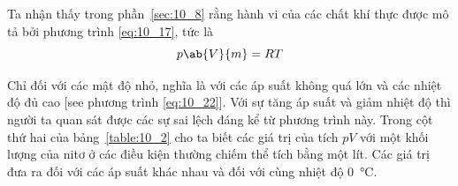 
Ta nhận thấy trong phần~\ref{sec:10_8} rằng hành vi của các chất khí thực được mô tả bởi phương trình \eqref{eq:10_17}, tức là
\begin{equation*}
	p\ab{V}{m} = RT
\end{equation*}

\noindent

Chỉ đối với các mật độ nhỏ, nghĩa là với các áp suất không quá lớn và các nhiệt độ đủ cao [see phương trình \eqref{eq:10_22}]. Với sự tăng áp suất và giảm nhiệt độ thì người ta quan sát được các sự sai lệch đáng kể từ phương trình này. Trong cột thứ hai của bảng~\ref{table:10_2} cho ta biết các giá trị của tích $pV$ với một khối lượng của nitơ ở các điều kiện thường chiếm thể tích bằng một lít. Các giá trị đưa ra đối với các áp suất khác nhau và đối với cùng nhiệt độ \SI{0}{\degreeCelsius}. 
\begin{table}[!htb]
	\vspace{-0.2cm}
	\renewcommand{\arraystretch}{1.2}
	\caption{ }
	\vspace{-0.6cm}
	\label{table:10_2}
	\begin{center}\end{center}
\end{table}


